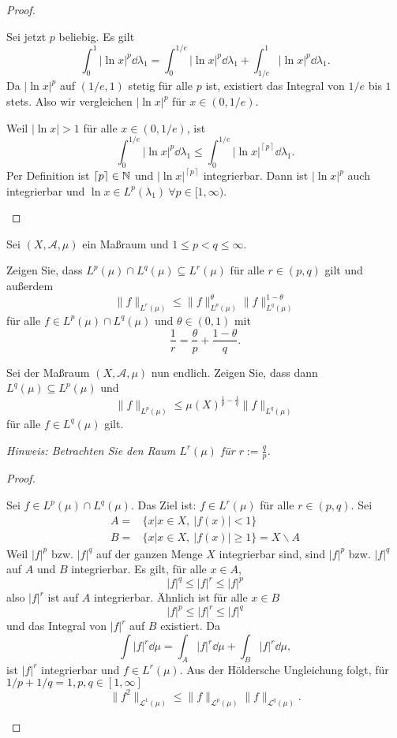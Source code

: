 \begin{proof}
\begin{parts}
	Sei jetzt $p$ beliebig. Es gilt
	\[
		\int_0^1 |\ln x|^p\dd{\lambda_1}=\int_0^{1 / e}|\ln x|^p\dd{\lambda_1}+\int_{1 / e}^1 |\ln x|^p\dd{\lambda_1}
	.\] 
	Da $|\ln x|^p$ auf $(1 / e, 1)$ stetig f\"{u}r alle $p$ ist, existiert das Integral von $1 / e$ bis $1$ stets. Also wir vergleichen $|\ln x|^p$ f\"{u}r $x\in (0,1 / e)$. 

	Weil $|\ln x|>1$ f\"{u}r alle $x\in (0, 1 / e)$, ist
	\[
		\int_0^{1 / e}|\ln x|^p\dd{\lambda_1}\le \int_0^{1 / e}|\ln x|^{\left\lceil  p \right\rceil}\dd{\lambda_1} 
	.\] 
	Per Definition ist $\left\lceil p \right\rceil \in \mathbb{N}$ und $|\ln x|^{\left\lceil p \right\rceil }$ integrierbar. Dann ist $|\ln x|^p$ auch integrierbar und $\ln x\in L^p(\lambda_1)~\forall p\in [1,\infty)$.\qedhere
	\end{parts}
\end{proof}
\begin{Problem}
	Sei $(X, \mathcal{A},\mu)$ ein Maßraum und $1\le p<q\le\infty$.
	\begin{parts}
	\item Zeigen Sie, dass $L^p(\mu)\cap L^q(\mu)\subseteq L^r(\mu)$ f\"{u}r alle $r\in (p,q)$ gilt und außerdem
		\[
			\|f\|_{L^r(\mu)}\le \|f\|_{L^p(\mu)}^\theta \|f\|_{L^q(\mu)}^{1-\theta}
		\] 
		f\"{u}r alle $f\in L^p(\mu)\cap L^q(\mu)$ und $\theta\in (0,1)$ mit
		\[
		\frac{1}{r}=\frac{\theta}{p}+\frac{1-\theta}{q}
		.\] 
	\item Sei der Maßraum $(X,\mathcal{A},\mu)$ nun endlich. Zeigen Sie, dass dann $L^q(\mu)\subseteq L^p(\mu)$ und
		\[
			\|f\|_{L^p(\mu)}\le \mu(X)^{\frac{1}{p}-\frac{1}{q}}\|f\|_{L^q(\mu)}
		\] 
		f\"{u}r alle $f\in L^q(\mu)$ gilt.

		\emph{Hinweis: Betrachten Sie den Raum $L^r(\mu)$ f\"{u}r $r:=\frac{q}{p}$.}
	\end{parts}
\end{Problem}
\begin{proof}
	\begin{parts}
	\item Sei $f\in L^p(\mu)\cap L^q(\mu)$. Das Ziel ist: $f\in L^r(\mu)$ f\"{u}r alle $r\in (p,q)$. Sei
\begin{align*}
	A=&\{x|x\in X,~|f(x)|<1\} \\
	B=&\{x|x\in X,~|f(x)|\ge 1\}=X\backslash A
\end{align*}
Weil $|f|^p$ bzw. $|f|^q$ auf der ganzen Menge $X$ integrierbar sind, sind $|f|^p$ bzw. $|f|^q$ auf $A$ und $B$ integrierbar. Es gilt, f\"{u}r alle $x\in A$,
\[
|f|^q \le |f|^r \le |f|^p
\]
also $|f|^r$ ist auf $A$ integrierbar. Ähnlich ist f\"{u}r alle $x\in B$ 
\[
|f|^p\le |f|^r\le |f|^q
\]
und das Integral von $|f|^r$ auf $B$ existiert. Da
\[
	\int |f|^r\dd{\mu}=\int_A |f|^r\dd{\mu}+\int_B |f|^r\dd{\mu}
,\]
ist $|f|^r$ integrierbar und $f\in L^r(\mu)$. Aus der Höldersche Ungleichung folgt, f\"{u}r $1 / p + 1 / q = 1, p,q\in [1,\infty]$
\[
	\|f^2\|_{\mathcal{L}^1(\mu)}\le \|f\|_{\mathcal{L}^p(\mu)}\|f\|_{\mathcal{L}^q(\mu)}
.\] 
	\end{parts}
\end{proof}
